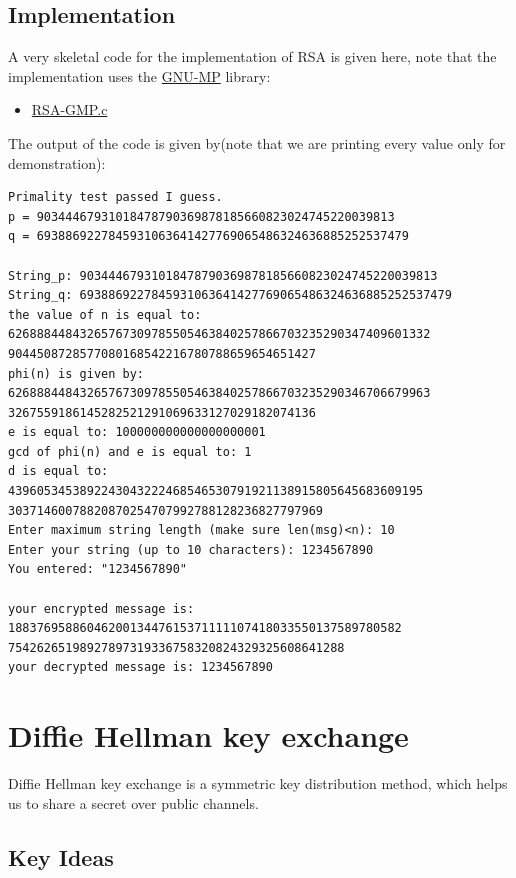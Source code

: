 \documentclass[12pt,a4paper]{report}
\begin{document}
\section{Implementation}
A very skeletal code for the implementation of RSA is given here, note that the implementation uses the \href{https://en.wikipedia.org/wiki/GNU_Multiple_Precision_Arithmetic_Library}{GNU-MP} library:
\begin{itemize}
    \item \href{https://github.com/Bing-Chilling-07/SciMathSoc-Encrypting-Eqns/blob/88b2d38ba99ae7b23f1a6825a756a4b4e0faa92e/Encryption%20Algorithms/RSA-GMP.c}{RSA-GMP.c}
\end{itemize}
The output of the code is given by(note that we are printing every value only for demonstration):
\begin{verbatim}
Primality test passed I guess.
p = 90344467931018478790369878185660823024745220039813
q = 6938869227845931063641427769065486324636885252537479

String_p: 90344467931018478790369878185660823024745220039813
String_q: 6938869227845931063641427769065486324636885252537479 
the value of n is equal to: 62688844843265767309785505463840257866703235290347409601332
9044508728577080168542216780788659654651427
phi(n) is given by: 62688844843265767309785505463840257866703235290346706679963
3267559186145282521291069633127029182074136
e is equal to: 100000000000000000001
gcd of phi(n) and e is equal to: 1
d is equal to: 4396053453892243043222468546530791921138915805645683609195
30371460078820870254707992788128236827797969
Enter maximum string length (make sure len(msg)<n): 10
Enter your string (up to 10 characters): 1234567890
You entered: "1234567890"

your encrypted message is: 1883769588604620013447615371111107418033550137589780582
75426265198927897319336758320824329325608641288
your decrypted message is: 1234567890
\end{verbatim}


\chapter{Diffie Hellman key exchange}
Diffie Hellman key exchange is a symmetric key distribution method, which helps us to share a secret over public channels.
\section{Key Ideas}
\end{document}
